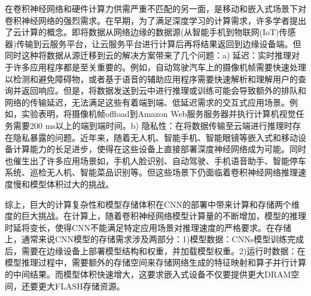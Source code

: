 在卷积神经网络和硬件计算力供需严重不匹配的另一面，是移动和嵌入式场景下对卷积神经网络的强烈需求。在早期，为了满足深度学习的计算需求，许多学者提出了云计算的概念。即将数据从网络边缘的数据源(从智能手机到物联网(IoT)传感器)传输到云服务平台，让云服务平台进行计算后再将结果返回到边缘设备端。但同时这种将数据从源迁移到云的解决方案带来了几个问题：a) 延迟：实时推理对于许多应用程序都是至关重要的。例如，自动驾驶汽车上的摄像机帧需要快速处理以检测和避免障碍物，或者基于语音的辅助应用程序需要快速解析和理解用户的查询并返回响应。但是，将数据发送到云中进行推理或训练可能会导致额外的排队和网络的传输延迟，无法满足这些有着端到端、低延迟需求的交互式应用场景。例如，实验表明，将摄像机帧offload到Amazon Web服务服务器并执行计算机视觉任务需要200 ms以上的端到端时间。b) 隐私性：在将数据传输至云端进行推理时存在隐私暴露的问题。近年来，随着无人机、智能手机、智能眼镜等嵌入式和移动设备计算能力的长足进步，使得在这些设备上直接部署深度神经网络成为可能。同时也催生出了许多应用场景如，手机人脸识别、自动驾驶、手机语音助手、智能停车系统、巡检无人机、智能菜品识别等。但这些场景下仍面临着卷积神经网络推理速度慢和模型体积过大的挑战。

综上，巨大的计算复杂性和模型存储体积在CNN的部署中带来计算和存储两个维度的巨大挑战。在计算上，随着卷积神经网络模型计算量的不断增加，模型的推理时延将变长，使得CNN不能满足特定应用场景对推理速度的严格要求。在存储上，通常来说CNN模型的存储需求涉及两部分\cite{liu2017learning,ren2019multi}：1)模型数据：CNNs模型训练完成后，需要在边缘设备上部署模型结构和权重，并加载模型权重。2)运行时数据：在模型推理过程中，需要额外的存储空间来存储网络生成的特征映射和算子并行计算的中间结果。而模型体积快速增大，这要求嵌入式设备不仅要提供更大DRAM空间，还要更大FLASH存储资源。


